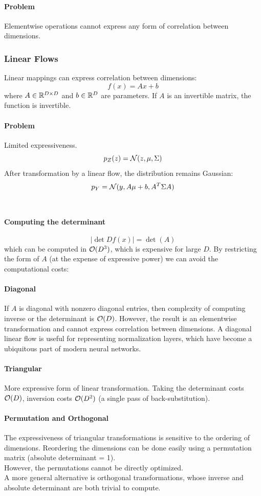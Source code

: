 \documentclass[11pt]{article}
\begin{document}
\paragraph{Problem}
Elementwise operations cannot express any form of correlation between dimensions.
\subsubsection{Linear Flows}
Linear mappings can express correlation between dimensions:
$$f(x) = Ax + b$$
where $A \in \mathbb{R}^{D \times D}$ and $b \in \mathbb{R}^D$ are parameters. If $A$ is an invertible matrix, the function is invertible.
\paragraph{Problem}
Limited expressiveness.
$$p_Z(z) = \mathcal{N}(z, \mu, \Sigma)$$
After transformation by a linear flow, the distribution remains Gaussian:
$$p_Y = \mathcal{N}(y, A\mu+b, A^T\Sigma A)$$
\\
\paragraph{Computing the determinant}
$$|\det Df(x)| = \det(A)$$
which can be computed in $\mathcal{O}(D^3)$, which is expensive for large $D$. By restricting the form of $A$ (at the expense of expressive power) we can avoid the computational costs:
\paragraph{Diagonal}
If $A$ is diagonal with nonzero diagonal entries, then complexity of computing inverse or the determinant is $\mathcal{O}(D)$. However, the result is an elementwise transformation and cannot express correlation between dimensions.
\remark
A diagonal linear flow is useful for representing normalization layers, which have become a ubiquitous part of modern neural networks.
\paragraph{Triangular}
More expressive form of linear transformation. Taking the determinant costs $\mathcal{O}(D)$, inversion costs $\mathcal{O}(D^2)$ (a single pass of back-substitution).

\paragraph{Permutation and Orthogonal}
The expressiveness of triangular transformations is sensitive to the ordering of dimensions. Reordering the dimensions can be done easily using a permutation matrix (absolute determinant = 1).\\
However, the permutations cannot be directly optimized.\\
A more general alternative is orthogonal transformations, whose inverse and absolute determinant are both trivial to compute.
\end{document}
